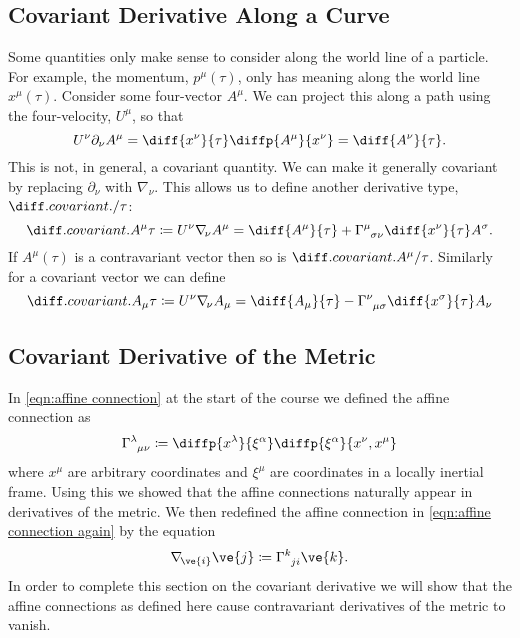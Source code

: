 \documentclass[fleqn]{NotesClass}
\newcommand*{\christoffel}[3]{\tensor{\Gamma}{^{#1}_{{#2}{#3}}}}
\newcommand*{\covariantDerivative}[1]{\nabla_{\!#1}}
\begin{document}
    \subsection{Covariant Derivative Along a Curve}
    Some quantities only make sense to consider along the world line of a particle.
    For example, the momentum, \(p^\mu(\tau)\), only has meaning along the world line \(x^\mu(\tau)\).
    Consider some four-vector \(A^\mu\).
    We can project this along a path using the four-velocity, \(U^\mu\), so that
    \begin{equation}
        U^\nu \partial_\nu A^\mu = \diff{x^\nu}{\tau} \diffp{A^\mu}{x^\nu} = \diff{A^\nu}{\tau}.
    \end{equation}
    This is not, in general, a covariant quantity.
    We can make it generally covariant by replacing \(\partial_\nu\) with \(\covariantDerivative{\nu}\).
    This allows us to define another derivative type, \(\diffcov{}/{\tau}\):
    \begin{equation}
        \diffcov{A^\mu}{\tau} \coloneqq U^\nu \covariantDerivative{\nu} A^\mu = \diff{A^\mu}{\tau} + \christoffel{\mu}{\sigma}{\nu} \diff{x^\nu}{\tau} A^\sigma.
    \end{equation}
    If \(A^\mu(\tau)\) is a contravariant vector then so is \(\diffcov{A^\mu}/{\tau}\).
    Similarly for a covariant vector we can define
    \begin{equation}
        \diffcov{A_\mu}{\tau} \coloneqq U^\nu \covariantDerivative{\nu} A_\mu = \diff{A_\mu}{\tau} - \christoffel{\nu}{\mu}{\sigma} \diff{x^\sigma}{\tau} A_\nu
    \end{equation}
    
    \subsection{Covariant Derivative of the Metric}
    In \cref{eqn:affine connection} at the start of the course we defined the affine connection as
    \begin{equation}
        \christoffel{\lambda}{\mu}{\nu} \coloneqq \diffp{x^\lambda}{\xi^\alpha} \diffp{\xi^\alpha}{x^\nu, x^\mu}
    \end{equation}
    where \(x^\mu\) are arbitrary coordinates and \(\xi^\mu\) are coordinates in a locally inertial frame.
    Using this we showed that the affine connections naturally appear in derivatives of the metric.
    We then redefined the affine connection in \cref{eqn:affine connection again} by the equation
    \begin{equation}
        \covariantDerivative{\ve{i}}\ve{j} \coloneqq \christoffel{k}{j}{i} \ve{k}.
    \end{equation}
    In order to complete this section on the covariant derivative we will show that the affine connections as defined here cause contravariant derivatives of the metric to vanish.
    
\end{document}
